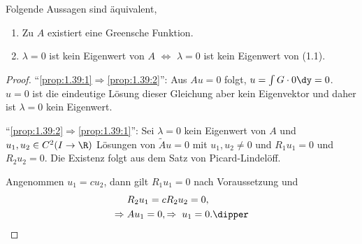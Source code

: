 \begin{prop}
\label{prop:1.39}
Folgende Aussagen sind äquivalent,
\begin{enumerate}[label=(\roman{*})]
  \item\label{prop:1.39:1} Zu $A$ existiert eine Greensche Funktion.
  \item\label{prop:1.39:2} $\lambda = 0$ ist kein Eigenwert von $A$
  $\Leftrightarrow$ $\lambda=0$ ist kein Eigenwert von (1.1).\fishhere
\end{enumerate}
\end{prop}
\begin{proof}
``\ref{prop:1.39:1}$\Rightarrow$\ref{prop:1.39:2}'':
Aus $Au=0$ folgt, $u=\int G\cdot 0\dy = 0$. $u=0$ ist die eindeutige Lösung
dieser Gleichung aber kein Eigenvektor und daher ist $\lambda=0$ kein Eigenwert.

``\ref{prop:1.39:2}$\Rightarrow$\ref{prop:1.39:1}'':
Sei $\lambda=0$ kein Eigenwert von $A$ und $u_1,u_2\in C^2(I\to\R)$ Lösungen von
$\tilde{A}u=0$ mit $u_1,u_2\neq 0$ und $R_1u_1 = 0$ und $R_2u_2 = 0$. Die
Existenz folgt aus dem Satz von Picard-Lindelöff.

Angenommen $u_1 = c u_2$, dann gilt $R_1u_1 = 0$ nach Voraussetzung und
\begin{align*}
&R_2u_1 = cR_2 u_2 = 0,\\
\Rightarrow\;& Au_1 = 0,
\Rightarrow\; u_1 = 0.\dipper
\end{align*}


\end{proof}
